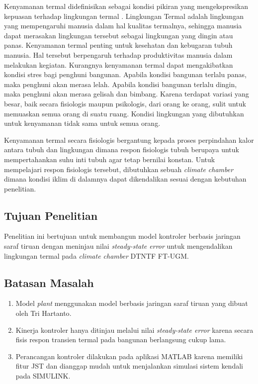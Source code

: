 \documentclass[a4paper,10pt]{article}
\newenvironment{body}{\begin{multicols}{2}}{\end{multicols}}
\begin{document}
\begin{body}
		Kenyamanan termal didefinisikan sebagai kondisi pikiran yang mengekspresikan kepuasan terhadap lingkungan termal \cite{ASHRAE55}. Lingkungan Termal adalah lingkungan yang mempengaruhi manusia dalam hal kualitas termalnya, sehingga manusia dapat merasakan lingkungan tersebut sebagai lingkungan yang dingin atau panas. Kenyamanan termal penting untuk kesehatan dan kebugaran tubuh manusia. Hal tersebut berpengaruh terhadap produktivitas manusia dalam melakukan kegiatan. Kurangnya kenyamanan termal dapat mengakibatkan kondisi stres bagi penghuni bangunan. Apabila kondisi bangunan terlalu panas, maka penghuni akan merasa lelah. Apabila kondisi bangunan terlalu dingin, maka penghuni akan merasa gelisah dan bimbang. Karena terdapat variasi yang besar, baik secara fisiologis maupun psikologis, dari orang ke orang, sulit untuk memuaskan semua orang di suatu ruang. Kondisi lingkungan yang dibutuhkan untuk kenyamanan tidak sama untuk semua orang. 
		
		Kenyamanan termal secara fisiologis bergantung kepada proses perpindahan kalor antara tubuh dan lingkungan dimana respon fisiologis tubuh berupaya untuk mempertahankan suhu inti tubuh agar tetap bernilai konstan. Untuk mempelajari respon fisiologis tersebut, dibutuhkan sebuah \textit{climate chamber} dimana kondisi iklim di dalamnya dapat dikendalikan sesuai dengan kebutuhan penelitian.\\
		
		\subsection{Tujuan Penelitian}
		Penelitian ini bertujuan untuk membangun model kontroler berbasis jaringan saraf tiruan dengan meninjau nilai \textit{steady-state error} untuk mengendalikan lingkungan termal pada \textit{climate chamber} DTNTF FT-UGM.\\
		
		\subsection{Batasan Masalah}\label{batasan masalah}
		\begin{enumerate}
			\item Model \textit{plant} menggunakan model berbasis jaringan saraf tiruan yang dibuat oleh Tri Hartanto\cite{skripsiTanto}.
			\item Kinerja kontroler hanya ditinjau melalui nilai \textit{steady-state error} karena secara fisis respon transien termal pada bangunan berlangsung cukup lama.
			\item Perancangan kontroler dilakukan pada aplikasi MATLAB karena memiliki fitur JST dan dianggap mudah untuk menjalankan simulasi sistem kendali pada SIMULINK.
		\end{enumerate}
		

\end{body}
\end{document}
